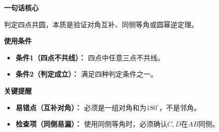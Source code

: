 \begin{summarybox}
	\textbf{\textcolor{CSummary}{一句话核心}}

	判定四点共圆，本质是验证对角互补、同侧等角或圆幂逆定理。

	\medskip
	\textbf{\textcolor{CSummary}{使用条件}}
	\begin{itemize}[leftmargin=*, itemsep=0.5em, topsep=0.4em]
		\item \textbf{条件1（四点不共线）：} 四点中任意三点不共线。
		\item \textbf{条件2（判定成立）：} 满足四种判定条件之一。
	\end{itemize}

	\medskip
	\textbf{\textcolor{CSummary}{关键提醒}}
	\begin{itemize}[leftmargin=*, itemsep=0.5em, topsep=0.4em]
		\item \textbf{易错点（互补对角）：} 必须是一组对角和为$180^{\circ}$，不是邻角。
		\item \textbf{检查项（同侧易漏）：} 使用同侧等角时，必须确认$C,D$在$AB$同侧。
	\end{itemize}
\end{summarybox}
